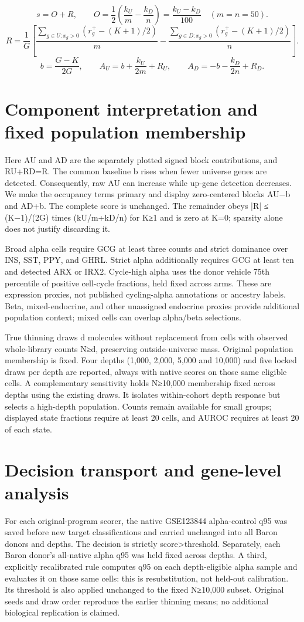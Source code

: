 \documentclass[11pt,letterpaper]{article}
\begin{document}
\[s=O+R,\qquad O=\frac{1}{2}\left(\frac{k_U}{m}-\frac{k_D}{n}\right)=\frac{k_U-k_D}{100}\quad(m=n=50).\]
\[R=\frac{1}{G}\left[\frac{\sum_{g\in U:x_g>0}(r_g^+-(K+1)/2)}{m}-\frac{\sum_{g\in D:x_g>0}(r_g^+-(K+1)/2)}{n}\right].\]
\[b=\frac{G-K}{2G},\qquad A_U=b+\frac{k_U}{2m}+R_U,\qquad A_D=-b-\frac{k_D}{2n}+R_D.\]
\section*{Component interpretation and fixed population membership}
Here AU and AD are the separately plotted signed block contributions, and RU+RD=R. The common baseline b rises when fewer universe genes are detected. Consequently, raw AU can increase while up-gene detection decreases. We make the occupancy terms primary and display zero-centered blocks AU−b and AD+b. The complete score is unchanged. The remainder obeys |R| ≤ (K−1)/(2G) times (kU/m+kD/n) for K≥1 and is zero at K=0; sparsity alone does not justify discarding it.

Broad alpha cells require GCG at least three counts and strict dominance over INS, SST, PPY, and GHRL. Strict alpha additionally requires GCG at least ten and detected ARX or IRX2. Cycle-high alpha uses the donor vehicle 75th percentile of positive cell-cycle fractions, held fixed across arms. These are expression proxies, not published cycling-alpha annotations or ancestry labels. Beta, mixed-endocrine, and other unassigned endocrine proxies provide additional population context; mixed cells can overlap alpha/beta selections.

True thinning draws d molecules without replacement from cells with observed whole-library counts N≥d, preserving outside-universe mass. Original population membership is fixed. Four depths (1,000, 2,000, 5,000 and 10,000) and five locked draws per depth are reported, always with native scores on those same eligible cells. A complementary sensitivity holds N≥10,000 membership fixed across depths using the existing draws. It isolates within-cohort depth response but selects a high-depth population. Counts remain available for small groups; displayed state fractions require at least 20 cells, and AUROC requires at least 20 of each state.

\section*{Decision transport and gene-level analysis}
For each original-program scorer, the native GSE123844 alpha-control q95 was saved before new target classifications and carried unchanged into all Baron donors and depths. The decision is strictly score>threshold. Separately, each Baron donor’s all-native alpha q95 was held fixed across depths. A third, explicitly recalibrated rule computes q95 on each depth-eligible alpha sample and evaluates it on those same cells: this is resubstitution, not held-out calibration. Its threshold is also applied unchanged to the fixed N≥10,000 subset. Original seeds and draw order reproduce the earlier thinning means; no additional biological replication is claimed.
\end{document}
